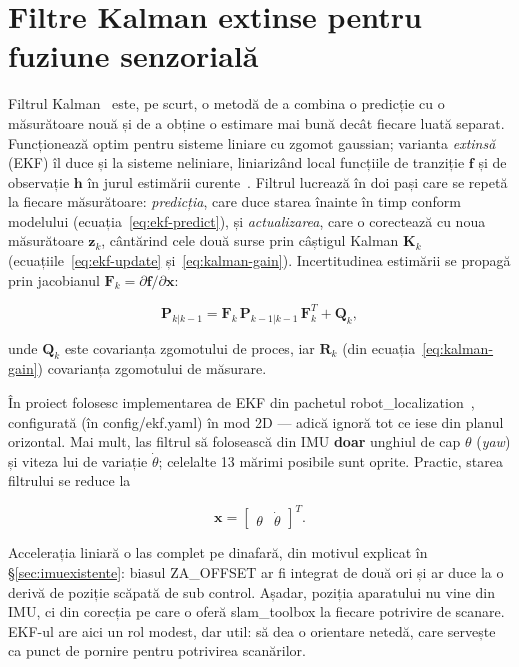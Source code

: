 \documentclass[a4paper,12pt,twoside,openany]{report}
\renewcommand{\texttt}[1]{\textnormal{#1}}
\begin{document}
\section{Filtre Kalman extinse pentru fuziune senzorială}
\label{sec:ekf}

Filtrul Kalman~\cite{kalman1960} este, pe scurt, o metodă de a combina o
predicție cu o măsurătoare nouă și de a obține o estimare mai bună decât
fiecare luată separat. Funcționează optim pentru sisteme liniare cu zgomot
gaussian; varianta \textit{extinsă} (EKF) îl duce și la sisteme neliniare,
liniarizând local funcțiile de tranziție $\mathbf{f}$ și de observație
$\mathbf{h}$ în jurul estimării curente~\cite{welchbishop2006kalman}. Filtrul
lucrează în doi pași care se repetă la fiecare măsurătoare:
\textit{predicția}, care duce starea înainte în timp conform modelului
(ecuația~\eqref{eq:ekf-predict}), și \textit{actualizarea}, care o corectează
cu noua măsurătoare $\mathbf{z}_k$, cântărind cele două surse prin câștigul
Kalman $\mathbf{K}_k$ (ecuațiile~\eqref{eq:ekf-update} și~\eqref{eq:kalman-gain}).
Incertitudinea estimării se propagă prin jacobianul
$\mathbf{F}_k = \partial\mathbf{f}/\partial\mathbf{x}$:

\begin{equation}\label{eq:ekf-cov}
    \mathbf{P}_{k|k-1} = \mathbf{F}_k\,\mathbf{P}_{k-1|k-1}\,\mathbf{F}_k^T + \mathbf{Q}_k,
\end{equation}

\noindent unde $\mathbf{Q}_k$ este covarianța zgomotului de proces, iar
$\mathbf{R}_k$ (din ecuația~\eqref{eq:kalman-gain}) covarianța zgomotului
de măsurare.

În proiect folosesc implementarea de EKF din pachetul
robot\_localization~\cite{moore2014robotlocalization}, configurată
(în \texttt{config/ekf.yaml}) în mod 2D — adică ignoră tot ce iese din planul
orizontal. Mai mult, las filtrul să folosească din IMU \textbf{doar} unghiul
de cap $\theta$ (\textit{yaw}) și viteza lui de variație $\dot{\theta}$;
celelalte 13 mărimi posibile sunt oprite. Practic, starea filtrului se reduce
la

\begin{equation}\label{eq:ekf-state}
    \mathbf{x} = \begin{bmatrix} \theta & \dot{\theta} \end{bmatrix}^{T}.
\end{equation}

Accelerația liniară o las complet pe dinafară, din motivul explicat în
§\ref{sec:imuexistente}: biasul \texttt{ZA\_OFFSET} ar fi integrat de două ori
și ar duce la o derivă de poziție scăpată de sub control. Așadar, poziția
aparatului nu vine din IMU, ci din corecția pe care o oferă slam\_toolbox la
fiecare potrivire de scanare. EKF-ul are aici un rol modest, dar util: să dea
o orientare netedă, care servește ca punct de pornire pentru potrivirea
scanărilor.
\end{document}
